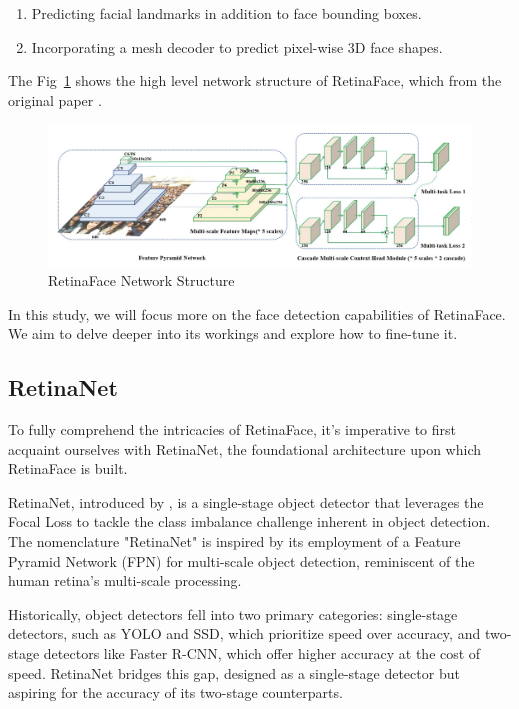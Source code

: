 \documentclass{article}
\begin{document}
\begin{enumerate}
\item Predicting facial landmarks in addition to face bounding boxes.
\item Incorporating a mesh decoder to predict pixel-wise 3D face shapes.
\end{enumerate}

The Fig~\ref{fig:structure} shows the high level network structure of RetinaFace, which from the original paper \cite{deng2020retinaface}.

\begin{figure}[h]
  \centering
  \includegraphics[width=0.7\linewidth]{images/network_structure}
  \caption{RetinaFace Network Structure}
  \label{fig:structure}
\end{figure}

In this study, we will focus more on the face detection capabilities of RetinaFace. We aim to delve deeper into its workings and explore how to fine-tune it.

\subsection{RetinaNet}

To fully comprehend the intricacies of RetinaFace, it's imperative to first acquaint ourselves with RetinaNet, the foundational architecture upon which RetinaFace is built. 

RetinaNet, introduced by \cite{lin2017focal}, is a single-stage object detector that leverages the Focal Loss to tackle the class imbalance challenge inherent in object detection. The nomenclature "RetinaNet" is inspired by its employment of a Feature Pyramid Network (FPN) for multi-scale object detection, reminiscent of the human retina's multi-scale processing.

Historically, object detectors fell into two primary categories: single-stage detectors, such as YOLO and SSD, which prioritize speed over accuracy, and two-stage detectors like Faster R-CNN, which offer higher accuracy at the cost of speed. RetinaNet bridges this gap, designed as a single-stage detector but aspiring for the accuracy of its two-stage counterparts.
\end{document}
